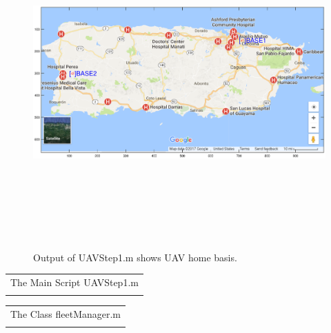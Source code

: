 \documentclass[12pt]{article}
\begin{document}
\newpage
\begin{figure}[!htpb]  
\centering
\includegraphics[width=6.25in, height=5in]{fig1.eps}
\caption{Output of UAVStep1.m shows UAV home basis.}
\label{fig8}
\end{figure}



\begin{table}[!htpb]
\centering
\begin{tabular}{|l|}\hline
The Main Script UAVStep1.m \\
\parbox[b]{6.2in}{}\\\hline
\end{tabular}
\end{table}
\begin{table}[!htpb]
\centering
\begin{tabular}{|l|}\hline
The Class fleetManager.m \\
\parbox[b]{6.2in}{}\\\hline
\end{tabular}
\end{table}
\end{document}
